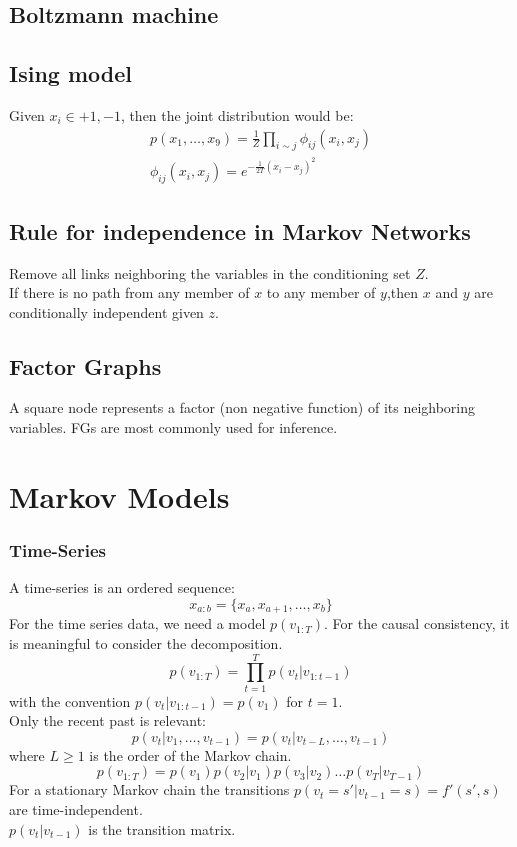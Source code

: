 \documentclass[12pt,a4paper]{article}
\begin{document}
\subsection*{Boltzmann machine}

\subsection*{Ising model}
Given $x_i\in {+1,-1}$, then the joint distribution would be:
\begin{eqnarray*}
p(x_1,\ldots,x_9)=\frac{1}{Z}\prod_{i\sim j}\phi_{ij}(x_i,x_j)\\
\phi_{ij}(x_i,x_j) = e^{-\frac{1}{2T}(x_i-x_j)^2}
\end{eqnarray*}
\subsection*{Rule for independence in Markov Networks}
Remove all links neighboring the variables in the conditioning set $Z$.\\
If there is no path from any member of $x$ to any member of $y$,then $x$ and $y$ are conditionally independent given $z$.
\subsection*{Factor Graphs}
A square node represents a factor (non negative function) of its neighboring variables. FGs are most commonly used for inference.
\section*{Markov Models}
\subsubsection*{Time-Series}
A time-series is an ordered sequence:
$$
x_{a:b}=\{x_a,x_{a+1},\ldots,x_b\}
$$
For the time series data, we need a model $p(v_{1:T})$. For the causal consistency, it is meaningful to consider the decomposition.
$$
p(v_{1:T}) = \prod_{t=1}^{T}p(v_t|v_{1:t-1})
$$
with the convention $p(v_t|v_{1:t-1}) = p(v_1)$ for $t=1$.\\
Only the recent past is relevant:
$$
p(v_t|v_1,\ldots,v_{t-1}) = p(v_t|v_{t-L},\ldots,v_{t-1})
$$
where $L\ge 1$ is the order of the Markov chain.
$$
p(v_{1:T}) = p(v_1)p(v_2|v_1)p(v_3|v_2)\ldots p(v_T|v_{T-1})
$$
For a stationary Markov chain the transitions $p(v_t=s'|v_{t-1}=s)=f'(s',s)$ are time-independent.\\
$p(v_t|v_{t-1})$ is the transition matrix.\\
\end{document}
